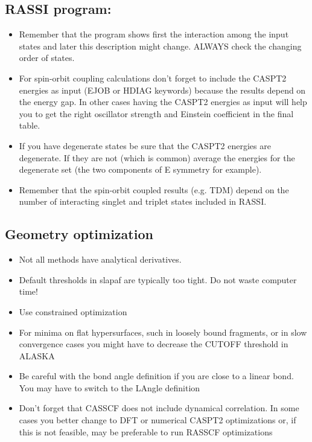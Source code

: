 
\subsection{RASSI program:}
\begin{itemize}
\item Remember that the program shows first the interaction among the input states and later this description might change. 
ALWAYS check the changing order of states. 
\item For spin-orbit coupling calculations don't forget to include the CASPT2 energies as input 
(EJOB or HDIAG keywords) because the results depend on the energy gap. In other cases 
having the CASPT2 energies as input will help you to get the right oscillator strength and 
Einstein coefficient in the final table. 
\item If you have degenerate states be sure that the CASPT2 energies are degenerate. If they 
are not (which is common) average the energies for the degenerate set (the two 
components of E symmetry for example). 
\item Remember that the spin-orbit coupled results (e.g. TDM) depend on the number of interacting singlet and triplet states included in RASSI. 
\end{itemize}



\subsection{Geometry optimization}
\begin{itemize}
\item Not all methods have analytical derivatives.
\item Default thresholds in slapaf are typically too tight. Do not waste computer time!
\item Use constrained optimization
\item For minima on flat hypersurfaces, such in loosely bound fragments, or in slow convergence 
cases you might have to decrease the CUTOFF threshold in ALASKA
\item Be careful with the bond angle definition if you are close to a linear bond. 
You may have to switch to the LAngle definition 
\item Don't forget that CASSCF does not include dynamical correlation. In some cases you better 
change to DFT or numerical CASPT2 optimizations or, if this is not feasible, may be 
preferable to run RASSCF optimizations 
\end{itemize}


